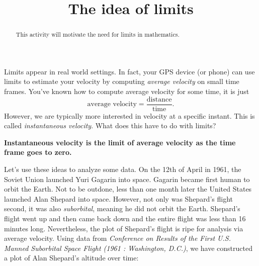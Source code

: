 \documentclass{ximera}
\title{The idea of limits}
\begin{document}
\begin{abstract}
  This activity will motivate the need for limits in mathematics.
\end{abstract}
\maketitle

Limits appear in real world settings. In fact, your GPS device (or
phone) can use limits to estimate your velocity by computing
\textit{average velocity} on small time frames. You've known how to
compute average velocity for some time, it is just
\[
\text{average velocity} = \frac{\text{distance}}{\text{time}}.
\]
However, we are typically more interested in velocity at a specific
instant. This is called \textit{instantaneous velocity}. What does
this have to do with limits? 
\begin{center}
  \textbf{Instantaneous velocity is the limit of average velocity as the time frame goes to zero.} 
\end{center}



Let's use these ideas to analyze some data. On the 12th of April in
1961, the Soviet Union launched Yuri Gagarin into space. Gagarin became
first human to orbit the Earth. Not to be outdone, less than one month
later the United States launched Alan Shepard into space. However, not
only was Shepard's flight second, it was also \textit{suborbital},
meaning he did not orbit the Earth. Shepard's flight went up and then
came back down and the entire flight was less than 16 minutes
long. Nevertheless, the plot of Shepard's flight is ripe for analysis
via average velocity. Using data from \textit{Conference on Results of
  the First U.S. Manned Suborbital Space Flight (1961 : Washington,
  D.C.)}, we have constructed a plot of Alan Shepard's altitude over
time:
\end{document}
